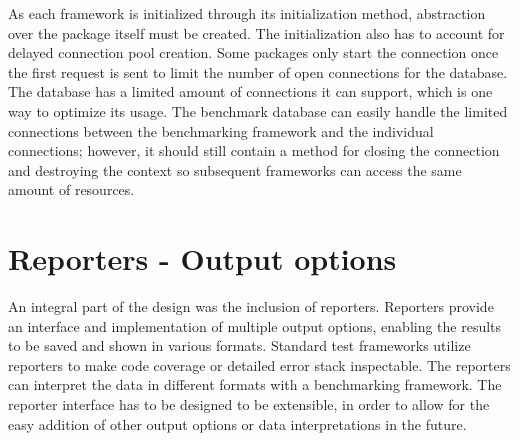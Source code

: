 As each framework is initialized through its initialization method, abstraction
over the package itself must be created. The initialization also has to account
for delayed connection pool creation. Some packages only start the connection
once the first request is sent to limit the number of open connections for the
database. The database has a limited amount of connections it can support, which
is one way to optimize its usage. The benchmark database can easily handle the
limited connections between the benchmarking framework and the individual
connections; however, it should still contain a method for closing the
connection and destroying the context so subsequent frameworks can access the
same amount of resources.

\section{Reporters - Output options}

An integral part of the design was the inclusion of reporters. Reporters provide
an interface and implementation of multiple output options, enabling the results
to be saved and shown in various formats. Standard test frameworks utilize
reporters to make code coverage or detailed error stack inspectable. The
reporters can interpret the data in different formats with a benchmarking
framework. The reporter interface has to be designed to be extensible, in order
to allow for the easy addition of other output options or data interpretations
in the future.
